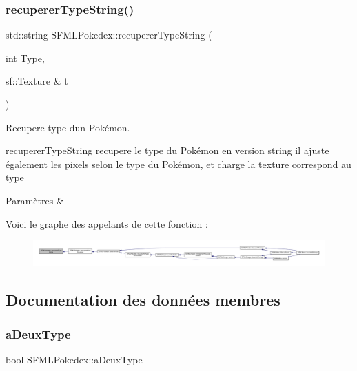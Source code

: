 \subsubsection{\texorpdfstring{recuperer\+Type\+String()}{recupererTypeString()}}
{\footnotesize\ttfamily std\+::string S\+F\+M\+L\+Pokedex\+::recuperer\+Type\+String (\begin{DoxyParamCaption}\item[{int}]{Type,  }\item[{sf\+::\+Texture \&}]{t }\end{DoxyParamCaption})\hspace{0.3cm}{\ttfamily [private]}}



Recupere type d\textquotesingle{}un Pokémon. 

recuperer\+Type\+String recupere le type du Pokémon en version string il ajuste également les pixels selon le type du Pokémon, et charge la texture correspond au type 
\begin{DoxyParams}{Paramètres}
{\em } & \\
\hline
\end{DoxyParams}
Voici le graphe des appelants de cette fonction \+:\nopagebreak
\begin{figure}[H]
\begin{center}
\leavevmode
\includegraphics[width=350pt]{class_s_f_m_l_pokedex_a16ac63df885664b02c66b06dd1cfa9ef_icgraph}
\end{center}
\end{figure}


\subsection{Documentation des données membres}
\mbox{\label{class_s_f_m_l_pokedex_a4403115ebd1ffb08d990151197d53a29}} 
\subsubsection{\texorpdfstring{a\+Deux\+Type}{aDeuxType}}
{\footnotesize\ttfamily bool S\+F\+M\+L\+Pokedex\+::a\+Deux\+Type\hspace{0.3cm}{\ttfamily [private]}}



